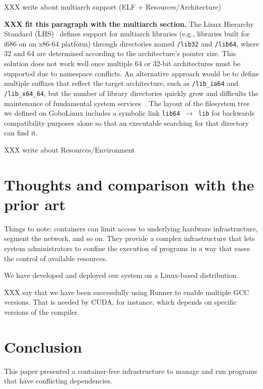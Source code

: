 \documentclass[sigplan, anonymous, 10pt]{acmart}
\begin{document}
XXX write about multiarch support (ELF + Resources/Architecture)
\lipsum[7]

\textbf{XXX fit this paragraph with the multiarch section.}
The Linux Hierarchy Standard (LHS)~\cite{lsb2015:fhs} defines support for
multiarch libraries (e.g., libraries built for i686 on an x86-64 platform)
through directories named \texttt{/lib32} and \texttt{/lib64},
where 32 and 64 are determined according to the architecture's pointer size.
This solution does not work well once multiple 64 or 32-bit architectures must
be supported due to namespace conflicts. An alternative approach would be to define
multiple suffixes that reflect the target architecture, such as \texttt{/lib\_ia64}
and \texttt{/lib\_x64\_64}, but the number of library directories quickly grow and
difficults the maintenance of fundamental system services~\cite{heen2005:thesis}.
The layout of the filesystem tree we defined on GoboLinux includes a symbolic link
\texttt{lib64 $\rightarrow$ lib} for backwards compatibility purposes alone so that
an executable searching for that directory can find it.

XXX write about Resources/Environment
\lipsum[8]

\section{Thoughts and comparison with the prior art}
Things to note: containers can limit access to underlying hardware infrastructure, segment the
network, and so on. They provide a complex infrastructure that lets system administrators to
confine the execution of programs in a way that eases the control of available resources.

We have developed and deployed our system on a Linux-based distribution.

XXX say that we have been successfully using Runner to enable multiple GCC versions.
That is needed by CUDA, for instance, which depends on specific versions of the compiler.

\lipsum[9-13]

\section{Conclusion}
This paper presented a container-free infrastructure to manage and run programs that have
conflicting dependencies. 

\lipsum[14-16]



\end{document}
